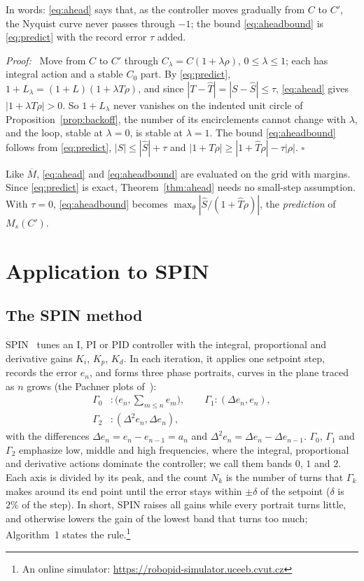 \documentclass[letterpaper, 10 pt, conference]{ieeeconf}
\renewenvironment{proof}{\noindent\textit{Proof:}\ }{\hfill$\square$\par\smallskip}
\newcommand{\spin}{SPIN\xspace}
\begin{document}
In words: \eqref{eq:ahead} says that, as the controller moves gradually
from $C$ to $C'$, the Nyquist curve never passes through $-1$; the bound
\eqref{eq:aheadbound} is \eqref{eq:predict} with the record error $\tau$
added.

\begin{proof}
Move from $C$ to $C'$ through $C_\lambda=C(1+\lambda\rho)$,
$0\le\lambda\le1$; each has integral action and a stable $C_0$ part. By
\eqref{eq:predict}, $1+L_\lambda=(1+L)(1+\lambda T\rho)$, and since
$|T-\hat T|=|S-\hat S|\le\tau$, \eqref{eq:ahead} gives
$|1+\lambda T\rho|>0$. So $1+L_\lambda$ never vanishes on the indented
unit circle of Proposition~\ref{prop:backoff}, the number of its
encirclements cannot change with $\lambda$, and the loop, stable at
$\lambda=0$, is stable at $\lambda=1$. The bound \eqref{eq:aheadbound}
follows from \eqref{eq:predict}, $|S|\le|\hat S|+\tau$ and
$|1+T\rho|\ge|1+\hat T\rho|-\tau|\rho|$.
\end{proof}

Like $\overline M$, \eqref{eq:ahead} and \eqref{eq:aheadbound} are
evaluated on the grid with margins. Since \eqref{eq:predict} is exact,
Theorem~\ref{thm:ahead} needs no small-step assumption. With $\tau=0$,
\eqref{eq:aheadbound} becomes $\max_\theta|\hat S/(1+\hat T\rho)|$, the
\emph{prediction} of $M_s(C')$.

\section{Application to \spin}
\label{sec:app}

\subsection{The \spin method}

\spin~\cite{SPIN} tunes an I, PI or PID controller with the integral,
proportional and derivative gains $K_i$, $K_p$, $K_d$. In each
iteration, it applies one setpoint step, records the error $e_n$, and
forms three phase portraits, curves in the plane traced as $n$ grows
(the Pachner plots of~\cite{SPIN}):
\begin{equation}
\begin{aligned}
\Gamma_0&:\big(e_n,\textstyle\sum_{m\le n}e_m\big),\qquad
\Gamma_1:(\Delta e_n,e_n),\\
\Gamma_2&:(\Delta^2e_n,\Delta e_n),
\end{aligned}
\label{eq:portraits}
\end{equation}
with the differences $\Delta e_n=e_n-e_{n-1}=a_n$ and
$\Delta^2e_n=\Delta e_n-\Delta e_{n-1}$. $\Gamma_0$, $\Gamma_1$ and
$\Gamma_2$ emphasize low, middle and high frequencies, where the
integral, proportional and derivative actions dominate the controller;
we call them bands $0$, $1$ and $2$. Each axis is divided by its peak,
and the count $N_k$ is the number of turns that $\Gamma_k$ makes around
its end point until the error stays within $\pm\delta$ of the setpoint
($\delta$ is $2\%$ of the step). In short, \spin raises all gains while
every portrait turns little, and otherwise lowers the gain of the lowest
band that turns too much; Algorithm~1 states the rule.\footnote{An online simulator:
\url{https://robopid-simulator.uceeb.cvut.cz}}
\end{document}
